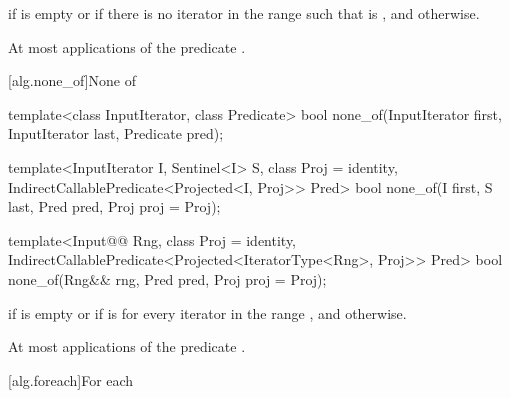 \begin{itemdescr}
\pnum
\returns {} if  is empty or
if there is no iterator  in the range
 such that
is , and  otherwise.

\pnum
\complexity At most  applications of the predicate
.
\end{itemdescr}

[alg.none_of]{None of}

%
\begin{removedblock}
\begin{itemdecl}
template<class InputIterator, class Predicate>
  bool none_of(InputIterator first, InputIterator last, Predicate pred);
\end{itemdecl}
\end{removedblock}
\begin{addedblock}
\begin{itemdecl}
template<InputIterator I, Sentinel<I> S, class Proj = identity,
    IndirectCallablePredicate<Projected<I, Proj>> Pred>
  bool none_of(I first, S last, Pred pred, Proj proj = Proj{});

template<Input@@ Rng, class Proj = identity,
    IndirectCallablePredicate<Projected<IteratorType<Rng>, Proj>> Pred>
  bool none_of(Rng&& rng, Pred pred, Proj proj = Proj{});
\end{itemdecl}
\end{addedblock}

\begin{itemdescr}
\pnum
\returns {} if
 is empty or if
is  for every iterator  in the range ,
and  otherwise.

\pnum
\complexity At most  applications of the predicate
.
\end{itemdescr}

[alg.foreach]{For each}

